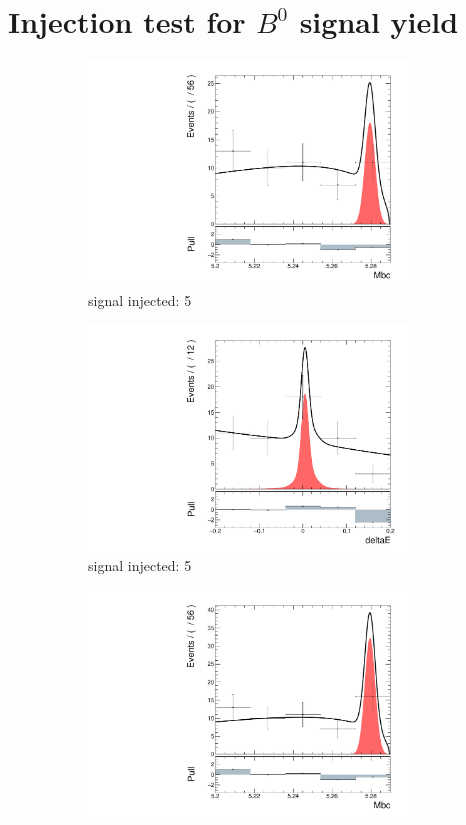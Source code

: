 \chapter{Injection test for $B^0$ signal yield}
\begin{figure}[htpb]
	\begin{subfigure}{0.5\linewidth}
		\includegraphics[page=1,height=6cm]{figures/injection_sig_5/ds_gen_Mbc_2D.pdf}
		\caption{signal injected: 5}
	\end{subfigure}
	\begin{subfigure}{0.5\linewidth}
		\includegraphics[page=1,height=6cm]{figures/injection_sig_5/ds_gen_deltaE_2D.pdf}
		\caption{signal injected: 5}
	\end{subfigure}
	\begin{subfigure}{0.5\linewidth}
		\includegraphics[page=1,height=6cm]{figures/injection_sig_10/ds_gen_Mbc_2D.pdf}

\end{subfigure}
\end{figure}

